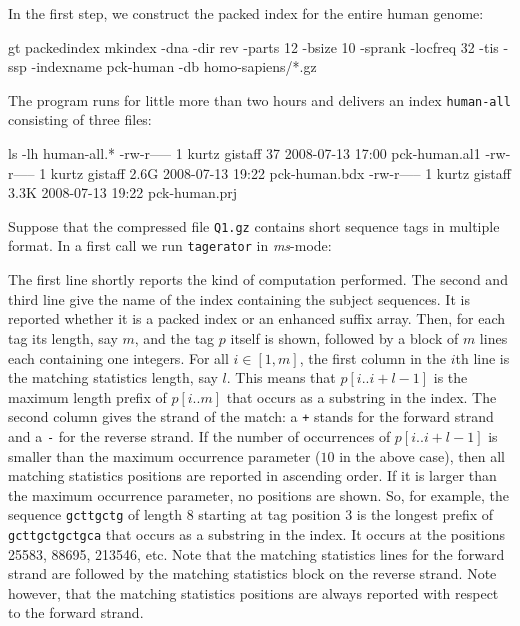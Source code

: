 \documentclass[12pt]{article}
\newcommand{\Substring}[3]{#1[#2..#3]}
\newcommand{\Program}[0]{\texttt{tagerator}\xspace}
\begin{document}
In the first step, we construct the packed index for the entire human genome:

\begin{Output}
gt packedindex mkindex -dna -dir rev -parts 12 -bsize 10 -sprank -locfreq 32
                       -tis -ssp -indexname pck-human -db homo-sapiens/*.gz
\end{Output}

The program runs for little more than two hours and delivers 
an index \texttt{human-all} consisting of three files:

\begin{Output}
ls -lh human-all.*
-rw-r----- 1 kurtz gistaff   37 2008-07-13 17:00 pck-human.al1
-rw-r----- 1 kurtz gistaff 2.6G 2008-07-13 19:22 pck-human.bdx
-rw-r----- 1 kurtz gistaff 3.3K 2008-07-13 19:22 pck-human.prj
\end{Output}

Suppose that the compressed file \texttt{Q1.gz} contains short sequence tags
in multiple \Fasta format. In a first call we run \Program in \textit{ms}-mode:


The first line shortly reports the kind of computation performed. The second
and third line give the name of the index containing the subject sequences.
It is reported whether it is a packed index or an enhanced suffix array. Then,
for each tag its length, say \(m\), and the tag \(p\) itself is shown, followed 
by a block of \(m\) lines each containing one integers. For all \(i\in[1,m]\), 
the first column in the \(i\)th line is the matching statistics length, say
\(l\). This means that \(\Substring{p}{i}{i+l-1}\) is the maximum length prefix
of \(\Substring{p}{i}{m}\) that occurs as a substring in the index. The
second column gives the strand of the match: a \texttt{+} stands for the
forward strand and a \texttt{-} for the reverse strand. If the number of 
occurrences of \(\Substring{p}{i}{i+l-1}\) is smaller than the maximum
occurrence parameter (\(10\) in the above case), then all matching statistics 
positions are reported in ascending order. If it is larger than the maximum
occurrence parameter, no positions are shown.
So, for example, the sequence \texttt{gcttgctg} of length 8 starting at tag
position 3 is the longest prefix of \texttt{gcttgctgctgca} that occurs as 
a substring in the index. It occurs at the positions 25583, 88695, 213546,
etc. Note that the matching statistics lines for the forward strand are
followed by the matching statistics block on the reverse strand. Note however,
that the matching statistics positions are always reported with respect to the
forward strand.
\end{document}
